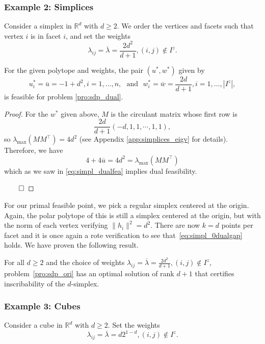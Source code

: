 \documentclass[smallextended, envcountsame]{svjour3}
\begin{document}
\subsubsection{Example 2: Simplices}\label{subsubsec:simplices}
    Consider a simplex in $\mathbb{R}^d$ with $d\ge 2$.  We order the vertices and facets such that vertex $i$ is in facet $i$, and set the weights 
    \begin{equation*}
        \lambda_{ij} = \overline{\lambda}= \frac{2d^2}{d+1},(i,j)\notin I^z.
    \end{equation*}
    
    \begin{lemma}
        For the given polytope and weights, the pair $(u^*,w^*)$ given by
            \begin{equation*}
            u_i^*  = \overline{u}= -1+d^2, i=1,\ldots,n,~~~\text{and}~~~w_i^* = \overline{w}= \frac{2d}{d+1}, i=1,\ldots,\left|I^z\right|,
    	\end{equation*}
        is feasible for problem \eqref{pro:sdp_dual}.
    \end{lemma}
    \begin{proof}
        For the $w^*$ given above, $M$ is the circulant matrix whose first row is $$\frac{2d}{d+1}\left(-d, 1, 1, \cdots , 1, 1 \right),$$ so $\lambda_{\max}(MM^\top)=4d^2$ (see Appendix \ref{app:simplices_eigv} for details).  Therefore, we have $$4+4\overline{u}= 4d^2 = \lambda_{\max}(MM^\top)$$ which as we saw in \eqref{eq:simpl_dualfea} implies dual feasibility.

    $\hfill\qed$
    \end{proof}
    
    For our primal feasible point, we pick a regular simplex centered at the origin. Again, the polar polytope of this is still a simplex centered at the origin, but with the norm of each vertex verifying
    $\|h_i\|^2=d^2$. There are now $k=d$ points per facet and it is once again a rote verification to see that~\eqref{eq:simpl_0dualgap} holds.  We have proven the following result.
    \begin{theorem}
        For all $d \geq 2$ and the choice of weights $\lambda_{ij} = \overline{\lambda}= \frac{2d^2}{d+1}, (i,j)\notin I^z$, problem~\eqref{pro:sdp_ori} has an optimal solution of rank $d+1$ that certifies inscribability of the $d$-simplex.
    \end{theorem}



\subsubsection{Example 3: Cubes}\label{subsubsec:cubes}
    Consider a cube in $\mathbb{R}^d$ with $d\ge 2$.  Set the weights
    \begin{equation*}
        \lambda_{ij} = \overline{\lambda}= d2^{1-d}, (i,j)\notin I^z.
    \end{equation*}
    
\end{document}
